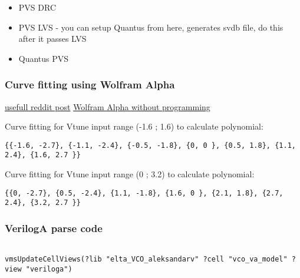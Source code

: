 \begin{itemize}
	\item PVS DRC 
	\item PVS LVS - you can setup Quantus from here, generates svdb file, do this after it passes LVS
	\item Quantus PVS 
\end{itemize}


\subsubsection*{Curve fitting using Wolfram Alpha}

\href{https://www.reddit.com/r/arduino/comments/12b7t9p/hello_everyone_im_trying_to_get_the_polynomial/}{usefull reddit post}
\href{https://www.wolframalpha.com/input?i=curve+fitting}{Wolfram Alpha without programming}

Curve fitting for Vtune input range (-1.6 ; 1.6) to calculate polynomial:

\begin{verbatim}
{{-1.6, -2.7}, {-1.1, -2.4}, {-0.5, -1.8}, {0, 0 }, {0.5, 1.8}, {1.1, 2.4}, {1.6, 2.7 }}	
\end{verbatim}
Curve fitting for Vtune input range (0 ; 3.2) to calculate polynomial:
\begin{verbatim}
{{0, -2.7}, {0.5, -2.4}, {1.1, -1.8}, {1.6, 0 }, {2.1, 1.8}, {2.7, 2.4}, {3.2, 2.7 }}		
\end{verbatim}

\subsubsection*{VerilogA parse code}

\begin{verbatim}

vmsUpdateCellViews(?lib "elta_VCO_aleksandarv" ?cell "vco_va_model" ?view "veriloga")
\end{verbatim}